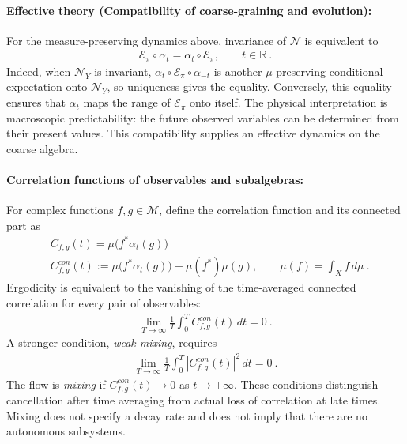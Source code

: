 \documentclass[a4paper,11pt]{article}
\theoremstyle{definition}
\newcommand{\nn}{\nonumber}
\newcommand{\mN}{\mathcal{N}}
\newcommand{\mM}{\mathcal{M}}
\newcommand{\mE}{\mathcal{E}}
\begin{document}

\paragraph{Effective theory (Compatibility of coarse-graining and evolution):}
For the measure-preserving dynamics above, invariance of $\mN$ is equivalent to
\begin{align}\label{eq:classical-expectation-equivariance}
    \mE_{\pi}\circ\alpha_t=\alpha_t\circ \mE_{\pi},
    \qquad t\in\mathbb R\ .
\end{align}
Indeed, when $\mN_Y$ is invariant, $\alpha_t\circ \mE_{\pi}\circ\alpha_{-t}$ is another $\mu$-preserving conditional expectation onto $\mN_Y$, so uniqueness gives the equality. Conversely, this equality ensures that $\alpha_t$ maps the range of $\mE_{\pi}$ onto itself. The physical interpretation is macroscopic predictability: the future observed variables can be determined from their present values. This compatibility supplies an effective dynamics on the coarse algebra.


\paragraph{Correlation functions of observables and subalgebras:}
For complex functions $f,g\in\mM$, define the correlation function and its connected part as
\begin{align}
    &C_{f,g}(t)=\mu\bigl(f^*\alpha_t(g)\bigr)\nn\\
    &C^{con}_{f,g}(t)
    :=\mu\bigl(f^*\alpha_t(g)\bigr)-\mu(f^*)\mu(g),
    \qquad \mu(f)=\int_X f\,d\mu\ .
\end{align}
Ergodicity is equivalent to the vanishing of the time-averaged connected correlation for every pair of observables:
\begin{align}
    \lim_{T\to\infty}\frac{1}{T}\int_0^T C^{con}_{f,g}(t)\,dt=0\ .
\end{align}
A stronger condition, {\it weak mixing}, requires
\begin{align}
    \lim_{T\to\infty}\frac{1}{T}\int_0^T |C^{con}_{f,g}(t)|^2\,dt=0\ .
\end{align}
The flow is {\it mixing} if $C^{con}_{f,g}(t)\to0$ as $t\to+\infty$. These conditions distinguish cancellation after time averaging from actual loss of correlation at late times. Mixing does not specify a decay rate and does not imply that there are no autonomous subsystems.
\end{document}
